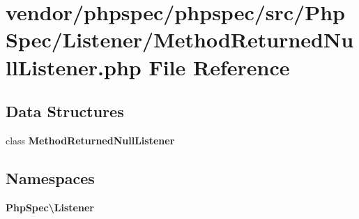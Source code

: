 \section{vendor/phpspec/phpspec/src/\+Php\+Spec/\+Listener/\+Method\+Returned\+Null\+Listener.php File Reference}
\label{_method_returned_null_listener_8php}
\subsection*{Data Structures}
\begin{DoxyCompactItemize}
\item 
class {\bf Method\+Returned\+Null\+Listener}
\end{DoxyCompactItemize}
\subsection*{Namespaces}
\begin{DoxyCompactItemize}
\item 
 {\bf Php\+Spec\textbackslash{}\+Listener}
\end{DoxyCompactItemize}
